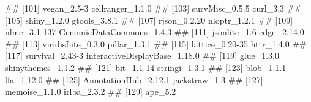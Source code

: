 \documentclass[8pt,a4,]{article}
\renewenvironment{verbatim}{\color{codecolor}\begin{myshaded}\begin{oldverbatim}}{\end{oldverbatim}\end{myshaded}}
\begin{document}
\begin{verbatim}
## [101] vegan_2.5-3                   cellranger_1.1.0             
## [103] survMisc_0.5.5                curl_3.3                     
## [105] shiny_1.2.0                   gtools_3.8.1                 
## [107] rjson_0.2.20                  nloptr_1.2.1                 
## [109] nlme_3.1-137                  GenomicDataCommons_1.4.3     
## [111] jsonlite_1.6                  edge_2.14.0                  
## [113] viridisLite_0.3.0             pillar_1.3.1                 
## [115] lattice_0.20-35               httr_1.4.0                   
## [117] survival_2.43-3               interactiveDisplayBase_1.18.0
## [119] glue_1.3.0                    shinythemes_1.1.2            
## [121] bit_1.1-14                    stringi_1.3.1                
## [123] blob_1.1.1                    lfa_1.12.0                   
## [125] AnnotationHub_2.12.1          jackstraw_1.3                
## [127] memoise_1.1.0                 irlba_2.3.2                  
## [129] ape_5.2
\end{verbatim}
\end{document}
